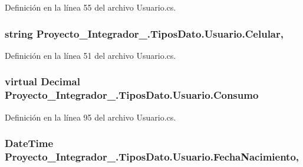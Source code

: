 Definición en la línea 55 del archivo Usuario.\-cs.

\hypertarget{class_proyecto___integrador__3_1_1_tipos_dato_1_1_usuario_aaf69133c2acd8387493608e39b5e4a2e}{
\subsubsection[{Celular}]{\setlength{\rightskip}{0pt plus 5cm}string Proyecto\-\_\-\-Integrador\-\_.\-Tipos\-Dato.\-Usuario.\-Celular\hspace{0.3cm}{\ttfamily [get]}, {\ttfamily [set]}}}\label{class_proyecto___integrador__3_1_1_tipos_dato_1_1_usuario_aaf69133c2acd8387493608e39b5e4a2e}


Definición en la línea 51 del archivo Usuario.\-cs.

\hypertarget{class_proyecto___integrador__3_1_1_tipos_dato_1_1_usuario_a17dc01f570b4c27936b81d486fc4a8bb}{
\subsubsection[{Consumo}]{\setlength{\rightskip}{0pt plus 5cm}virtual Decimal Proyecto\-\_\-\-Integrador\-\_.\-Tipos\-Dato.\-Usuario.\-Consumo\hspace{0.3cm}{\ttfamily [get]}}}\label{class_proyecto___integrador__3_1_1_tipos_dato_1_1_usuario_a17dc01f570b4c27936b81d486fc4a8bb}


Definición en la línea 95 del archivo Usuario.\-cs.

\hypertarget{class_proyecto___integrador__3_1_1_tipos_dato_1_1_usuario_acb7c4051a5323df336c32d932b5e83bb}{
\subsubsection[{Fecha\-Nacimiento}]{\setlength{\rightskip}{0pt plus 5cm}Date\-Time Proyecto\-\_\-\-Integrador\-\_.\-Tipos\-Dato.\-Usuario.\-Fecha\-Nacimiento\hspace{0.3cm}{\ttfamily [get]}, {\ttfamily [set]}}}\label{class_proyecto___integrador__3_1_1_tipos_dato_1_1_usuario_acb7c4051a5323df336c32d932b5e83bb}



